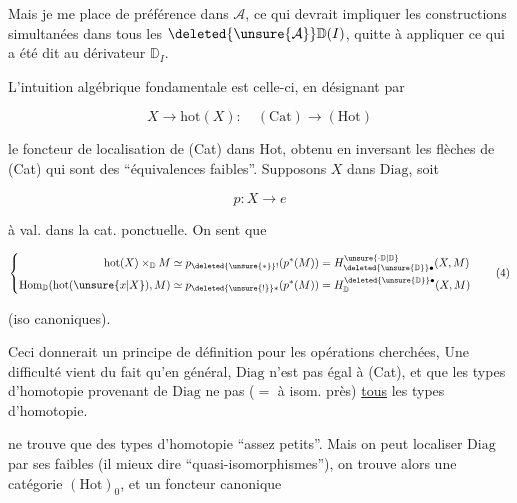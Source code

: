 
Mais je me place de préférence dans $\mathcal A$, ce qui devrait impliquer les constructions simultanées dans tous les $\deleted{\unsure{\mathcal A}}\mathbb D(I)$, quitte à appliquer ce qui a été dit au dérivateur $\mathbb D_I$.

L'intuition algébrique fondamentale est celle-ci, en désignant par

\[X\longrightarrow\mathrm{hot}(X):\quad(\mathrm{Cat})\longrightarrow(\mathrm{Hot})\]

le foncteur de localisation de (Cat) dans Hot, obtenu en inversant les flèches de (Cat) qui sont des ``équivalences faibles''. Supposons $X$ dans $\mathrm{Diag}$, soit 

\[p:X\longrightarrow e\]

  à val. dans la cat. ponctuelle. On sent que

\[
\left\{\begin{aligned}
\mathrm{hot}(X)\times_{\mathbb D}M&\simeq p_{\deleted{\unsure{*}}!}(p^{*}(M))
=H^{\unsure{\cdot\mathbb D|\mathbb D}}_{\deleted{\unsure{\mathbb D}}\bullet}(X,M)\\
\mathrm{Hom}_{\mathbb D}(\mathrm{hot}(\unsure{x|X}),M)&\simeq p_{\deleted{\unsure{!}}*}(p^{*}(M))
=H_{\mathbb D}^{\deleted{\unsure{\mathbb D}}\bullet}(X,M)
\end{aligned}\right.\tag*{(4)}
\]

(iso canoniques).


Ceci donnerait un principe de définition pour les opérations cherchées, Une difficulté vient du fait qu'en général, $\mathrm{Diag}$ n'est pas égal à (Cat), et que les types d'homotopie provenant de $\mathrm{Diag}$ ne   pas ($=$ à isom. près) \uline{tous} les types d'homotopie.

  ne trouve que des types d'homotopie ``assez petits''. Mais on peut localiser $\mathrm{Diag}$ par ses   faibles (il  mieux dire ``quasi-isomorphismes''), on trouve alors une catégorie  $(\mathrm{Hot})_0$, et un foncteur canonique

